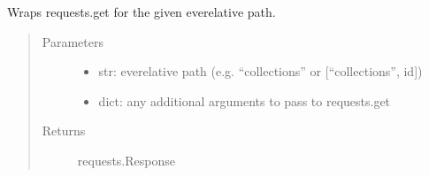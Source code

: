 \documentclass[letterpaper,10pt,english]{sphinxmanual}
\begin{document}

\begin{fulllineitems}
\label{\detokenize{autoapi/pine/backend/data/service/index:pine.backend.data.service.get}}
Wraps requests.get for the given eve\sphinxhyphen{}relative path.
\begin{quote}\begin{description}
\item[{Parameters}] \leavevmode\begin{itemize}
\item {} 
 \textendash{} str: eve\sphinxhyphen{}relative path (e.g. “collections” or {[}“collections”, id{]})

\item {} 
 \textendash{} 
dict: any additional arguments to pass to requests.get


\end{itemize}

\item[{Returns}] \leavevmode
requests.Response

\end{description}\end{quote}

\end{fulllineitems}

\end{document}
